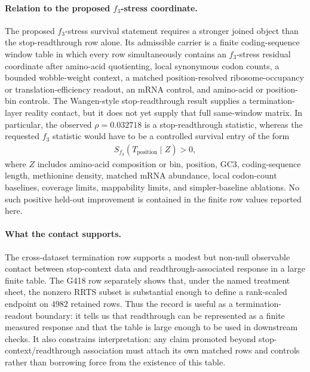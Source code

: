\paragraph{Relation to the proposed $f_3$-stress coordinate.}
The proposed $f_3$-stress survival statement requires a stronger joined object than the stop-readthrough row alone.  Its admissible carrier is a finite coding-sequence window table in which every row simultaneously contains an $f_3$-stress residual coordinate after amino-acid quotienting, local synonymous codon counts, a bounded wobble-weight context, a matched position-resolved ribosome-occupancy or translation-efficiency readout, an mRNA control, and amino-acid or position-bin controls.  The Wangen-style stop-readthrough result supplies a termination-layer reality contact, but it does not yet supply that full same-window matrix.  In particular, the observed $\rho=0.032718$ is a stop-readthrough statistic, whereas the requested $f_3$ statistic would have to be a controlled survival entry of the form
$$
\begin{aligned}
S_{f_3}(T_{\mathrm{position}}\mid Z) > 0,
\end{aligned}
$$
where $Z$ includes amino-acid composition or bin, position, GC3, coding-sequence length, methionine density, matched mRNA abundance, local codon-count baselines, coverage limits, mappability limits, and simpler-baseline ablations.  No such positive held-out improvement is contained in the finite row values reported here.

\paragraph{What the contact supports.}
The cross-dataset termination row supports a modest but non-null observable contact between stop-context data and readthrough-associated response in a large finite table.  The G418 row separately shows that, under the named treatment sheet, the nonzero RRTS subset is substantial enough to define a rank-scaled endpoint on $4982$ retained rows.  Thus the record is useful as a termination-readout boundary: it tells us that readthrough can be represented as a finite measured response and that the table is large enough to be used in downstream checks.  It also constrains interpretation: any claim promoted beyond stop-context/readthrough association must attach its own matched rows and controls rather than borrowing force from the existence of this table.


